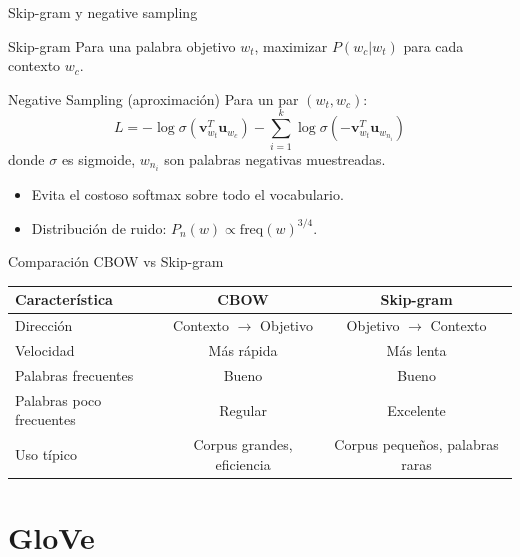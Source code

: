 \documentclass[aspectratio=169, 10pt, xcolor=table]{beamer}
\begin{document}
\begin{frame}{Skip-gram y negative sampling}
    \begin{block}{Skip-gram}
        Para una palabra objetivo $w_t$, maximizar $P(w_c | w_t)$ para cada contexto $w_c$.
    \end{block}
    \begin{block}{Negative Sampling (aproximación)}
        Para un par $(w_t, w_c)$:
        \[
        L = -\log \sigma(\mathbf{v}_{w_t}^T \mathbf{u}_{w_c}) - \sum_{i=1}^{k} \log \sigma(-\mathbf{v}_{w_t}^T \mathbf{u}_{w_{n_i}})
        \]
        donde $\sigma$ es sigmoide, $w_{n_i}$ son palabras negativas muestreadas.
    \end{block}
    \begin{itemize}
        \item Evita el costoso softmax sobre todo el vocabulario.
        \item Distribución de ruido: $P_n(w) \propto \text{freq}(w)^{3/4}$.
    \end{itemize}
\end{frame}

\begin{frame}{Comparación CBOW vs Skip-gram}
    \begin{table}
        \centering
        \begin{tabular}{l|c|c}
            \toprule
            \textbf{Característica} & \textbf{CBOW} & \textbf{Skip-gram} \\
            \midrule
            Dirección & Contexto $\rightarrow$ Objetivo & Objetivo $\rightarrow$ Contexto \\
            Velocidad & Más rápida & Más lenta \\
            Palabras frecuentes & Bueno & Bueno \\
            Palabras poco frecuentes & Regular & Excelente \\
            Uso típico & Corpus grandes, eficiencia & Corpus pequeños, palabras raras \\
            \bottomrule
        \end{tabular}
    \end{table}
\end{frame}

\section{GloVe}
\end{document}
